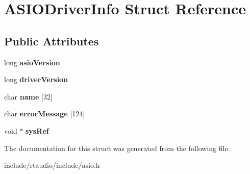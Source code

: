 \hypertarget{struct_a_s_i_o_driver_info}{}\section{A\+S\+I\+O\+Driver\+Info Struct Reference}
\label{struct_a_s_i_o_driver_info}
\subsection*{Public Attributes}
\begin{DoxyCompactItemize}
\item 
long {\bfseries asio\+Version}\hypertarget{struct_a_s_i_o_driver_info_a591ea5dfa4f4fa0f74f5be499cbe5886}{}\label{struct_a_s_i_o_driver_info_a591ea5dfa4f4fa0f74f5be499cbe5886}

\item 
long {\bfseries driver\+Version}\hypertarget{struct_a_s_i_o_driver_info_ac172bca3285484a89c788cbd80585bf8}{}\label{struct_a_s_i_o_driver_info_ac172bca3285484a89c788cbd80585bf8}

\item 
char {\bfseries name} \mbox{[}32\mbox{]}\hypertarget{struct_a_s_i_o_driver_info_a87463aa0061fbe3d7bb7ab6df251f046}{}\label{struct_a_s_i_o_driver_info_a87463aa0061fbe3d7bb7ab6df251f046}

\item 
char {\bfseries error\+Message} \mbox{[}124\mbox{]}\hypertarget{struct_a_s_i_o_driver_info_ab36c55bd139611e3feff1e1728559b35}{}\label{struct_a_s_i_o_driver_info_ab36c55bd139611e3feff1e1728559b35}

\item 
void $\ast$ {\bfseries sys\+Ref}\hypertarget{struct_a_s_i_o_driver_info_a283fe9c8e768ec2df65a23bf71624184}{}\label{struct_a_s_i_o_driver_info_a283fe9c8e768ec2df65a23bf71624184}

\end{DoxyCompactItemize}


The documentation for this struct was generated from the following file\+:\begin{DoxyCompactItemize}
\item 
include/rtaudio/include/asio.\+h\end{DoxyCompactItemize}
